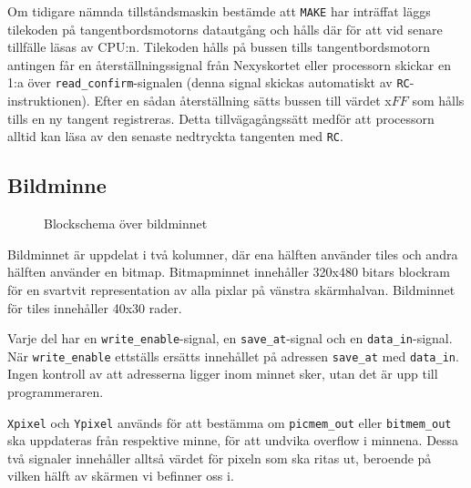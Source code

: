 \documentclass[]{article}
\begin{document}
Om tidigare nämnda tillståndsmaskin bestämde att \texttt{MAKE} har inträffat läggs tilekoden på tangentbordsmotorns datautgång och hålls där för att vid senare tillfälle läsas av CPU:n. Tilekoden hålls på bussen tills tangentbordsmotorn antingen får en återställningssignal från Nexyskortet eller processorn skickar en 1:a över \texttt{read\_confirm}-signalen (denna signal skickas automatiskt av \texttt{RC}-instruktionen). Efter en sådan återställning sätts bussen till värdet x$FF$ som hålls tills en ny tangent registreras. Detta tillvägagångssätt medför att processorn alltid kan läsa av den senaste nedtryckta tangenten med \texttt{RC}.

\newpage
\subsection{Bildminne}
\begin{figure}[h!]
	\caption{Blockschema över bildminnet}
\end{figure}

\noindent
Bildminnet är uppdelat i två kolumner, där ena hälften använder tiles och andra hälften använder en bitmap. Bitmapminnet innehåller 320x480 bitars blockram för en svartvit representation av alla pixlar på vänstra skärmhalvan. Bildminnet för tiles innehåller 40x30 rader.

Varje del har en \texttt{write\_enable}-signal, en \texttt{save\_at}-signal och en \texttt{data\_in}-signal. När \texttt{write\_enable} ettställs ersätts innehållet på adressen \texttt{save\_at} med \texttt{data\_in}. Ingen kontroll av att adresserna ligger inom minnet sker, utan det är upp till programmeraren.

\label{parag:picmempixel}
\texttt{Xpixel} och \texttt{Ypixel} används för att bestämma om \texttt{picmem\_out} eller \texttt{bitmem\_out} ska uppdateras från respektive minne, för att undvika overflow i minnena. Dessa två signaler innehåller alltså värdet för pixeln som ska ritas ut, beroende på vilken hälft av skärmen vi befinner oss i.
\end{document}
